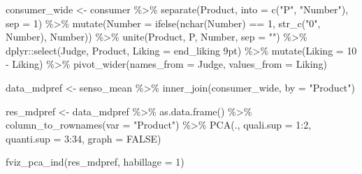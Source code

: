 \documentclass[
]{krantz}
\makeatletter
\newenvironment{Shaded}{\begin{snugshade}}{\end{snugshade}}
\newcommand{\AttributeTok}[1]{\textcolor[rgb]{0.61,0.61,0.61}{#1}}
\newcommand{\ConstantTok}[1]{\textcolor[rgb]{0,0,0}{#1}}
\newcommand{\DecValTok}[1]{\textcolor[rgb]{0.06,0.06,0.06}{#1}}
\newcommand{\FunctionTok}[1]{\textcolor[rgb]{0,0,0}{#1}}
\newcommand{\NormalTok}[1]{#1}
\newcommand{\OtherTok}[1]{\textcolor[rgb]{0.37,0.37,0.37}{#1}}
\newcommand{\SpecialCharTok}[1]{\textcolor[rgb]{0,0,0}{#1}}
\newcommand{\StringTok}[1]{\textcolor[rgb]{0.5,0.5,0.5}{#1}}
\newenvironment{kframe}{%
\medskip{}
\setlength{\fboxsep}{.8em}
 \def\at@end@of@kframe{}%
 \ifinner\ifhmode%
  \def\at@end@of@kframe{\end{minipage}}%
  \begin{minipage}{\columnwidth}%
 \fi\fi%
 \def\FrameCommand##1{\hskip\@totalleftmargin \hskip-\fboxsep
 \colorbox{shadecolor}{##1}\hskip-\fboxsep
     \hskip-\linewidth \hskip-\@totalleftmargin \hskip\columnwidth}%
 \MakeFramed {\advance\hsize-\width
   \@totalleftmargin\z@ \linewidth\hsize
   \@setminipage}}%
 {\par\unskip\endMakeFramed%
 \at@end@of@kframe}
\renewenvironment{Shaded}{\begin{kframe}}{\end{kframe}}
\makeatother
\begin{document}
\begin{Shaded}
\begin{Highlighting}[]
\NormalTok{consumer\_wide }\OtherTok{\textless{}{-}}\NormalTok{ consumer }\SpecialCharTok{\%\textgreater{}\%}
  \FunctionTok{separate}\NormalTok{(Product, }\AttributeTok{into =} \FunctionTok{c}\NormalTok{(}\StringTok{"P"}\NormalTok{, }\StringTok{"Number"}\NormalTok{), }\AttributeTok{sep =} \DecValTok{1}\NormalTok{) }\SpecialCharTok{\%\textgreater{}\%}
  \FunctionTok{mutate}\NormalTok{(}\AttributeTok{Number =} \FunctionTok{ifelse}\NormalTok{(}\FunctionTok{nchar}\NormalTok{(Number) }\SpecialCharTok{==} \DecValTok{1}\NormalTok{, }\FunctionTok{str\_c}\NormalTok{(}\StringTok{"0"}\NormalTok{, Number), Number)) }\SpecialCharTok{\%\textgreater{}\%}
  \FunctionTok{unite}\NormalTok{(Product, P, Number, }\AttributeTok{sep =} \StringTok{""}\NormalTok{) }\SpecialCharTok{\%\textgreater{}\%}
\NormalTok{  dplyr}\SpecialCharTok{::}\FunctionTok{select}\NormalTok{(Judge, Product, }\AttributeTok{Liking =} \StringTok{\textasciigrave{}}\AttributeTok{end\_liking 9pt}\StringTok{\textasciigrave{}}\NormalTok{) }\SpecialCharTok{\%\textgreater{}\%}
  \FunctionTok{mutate}\NormalTok{(}\AttributeTok{Liking =} \DecValTok{10} \SpecialCharTok{{-}}\NormalTok{ Liking) }\SpecialCharTok{\%\textgreater{}\%}
  \FunctionTok{pivot\_wider}\NormalTok{(}\AttributeTok{names\_from =}\NormalTok{ Judge, }\AttributeTok{values\_from =}\NormalTok{ Liking)}

\NormalTok{data\_mdpref }\OtherTok{\textless{}{-}}\NormalTok{ senso\_mean }\SpecialCharTok{\%\textgreater{}\%}
  \FunctionTok{inner\_join}\NormalTok{(consumer\_wide, }\AttributeTok{by =} \StringTok{"Product"}\NormalTok{)}

\NormalTok{res\_mdpref }\OtherTok{\textless{}{-}}\NormalTok{ data\_mdpref }\SpecialCharTok{\%\textgreater{}\%}
  \FunctionTok{as.data.frame}\NormalTok{() }\SpecialCharTok{\%\textgreater{}\%}
  \FunctionTok{column\_to\_rownames}\NormalTok{(}\AttributeTok{var =} \StringTok{"Product"}\NormalTok{) }\SpecialCharTok{\%\textgreater{}\%}
  \FunctionTok{PCA}\NormalTok{(., }\AttributeTok{quali.sup =} \DecValTok{1}\SpecialCharTok{:}\DecValTok{2}\NormalTok{, }\AttributeTok{quanti.sup =} \DecValTok{3}\SpecialCharTok{:}\DecValTok{34}\NormalTok{, }\AttributeTok{graph =} \ConstantTok{FALSE}\NormalTok{)}

\FunctionTok{fviz\_pca\_ind}\NormalTok{(res\_mdpref, }\AttributeTok{habillage =} \DecValTok{1}\NormalTok{)}
\end{Highlighting}
\end{Shaded}
\end{document}
